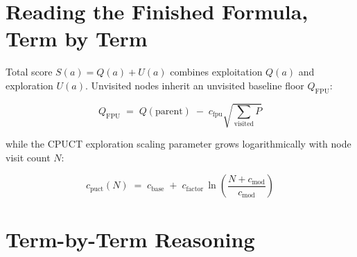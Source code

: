 \section{Reading the Finished Formula, Term by Term}

Total score $S(a) = Q(a) + U(a)$ combines exploitation $Q(a)$ and exploration $U(a)$. Unvisited nodes inherit an unvisited baseline floor $Q_{\text{FPU}}$:

\begin{equation}
\label{eq:E11}
\boxed{\;Q_{\text{FPU}} \;=\; Q(\text{parent}) \;-\; c_{\text{fpu}}\sqrt{\sum_{\text{visited}} P}\;}
\end{equation}

while the CPUCT exploration scaling parameter grows logarithmically with node visit count $N$:

\begin{equation}
\label{eq:E12}
\boxed{\;c_{\text{puct}}(N) \;=\; c_{\text{base}} \;+\; c_{\text{factor}}\,\ln\left(\frac{N + c_{\text{mod}}}{c_{\text{mod}}}\right)\;}
\end{equation}

\begin{established}
\begin{center}

\label{fig:1_10}
\end{center}
\end{established}

\section{Term-by-Term Reasoning}

